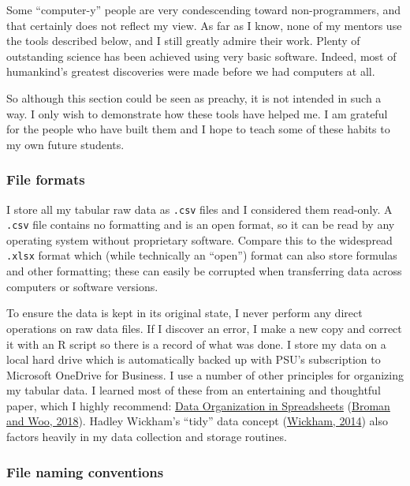 \documentclass[
  letterpaper,
  openany]{book}
\begin{document}
Some ``computer-y'' people are very condescending toward non-programmers, and that certainly does not reflect my view.
As far as I know, none of my mentors use the tools described below, and I still greatly admire their work.
Plenty of outstanding science has been achieved using very basic software.
Indeed, most of humankind's greatest discoveries were made before we had computers at all.

So although this section could be seen as preachy, it is not intended in such a way.
I only wish to demonstrate how these tools have helped me.
I am grateful for the people who have built them and I hope to teach some of these habits to my own future students.

\hypertarget{file-formats}{%
\subsubsection{File formats}\label{file-formats}}

I store all my tabular raw data as \texttt{.csv} files and I considered them read-only.
A \texttt{.csv} file contains no formatting and is an open format, so it can be read by any operating system without proprietary software.
Compare this to the widespread \texttt{.xlsx} format which (while technically an ``open'') format can also store formulas and other formatting; these can easily be corrupted when transferring data across computers or software versions.

To ensure the data is kept in its original state, I never perform any direct operations on raw data files.
If I discover an error, I make a new copy and correct it with an R script so there is a record of what was done.
I store my data on a local hard drive which is automatically backed up with PSU's subscription to Microsoft OneDrive for Business.
I use a number of other principles for organizing my tabular data.
I learned most of these from an entertaining and thoughtful paper, which I highly recommend: \href{https://doi.org/10.1080/00031305.2017.1375989}{Data Organization in Spreadsheets} (\protect\hyperlink{ref-Broman2018}{Broman and Woo, 2018}).
Hadley Wickham's ``tidy'' data concept (\protect\hyperlink{ref-Wickham2014}{Wickham, 2014}) also factors heavily in my data collection and storage routines.

\hypertarget{file-naming-conventions}{%
\subsubsection{File naming conventions}\label{file-naming-conventions}}
\end{document}
